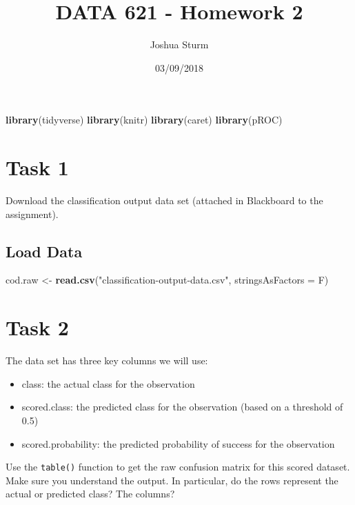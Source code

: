 \documentclass[]{article}
\title{DATA 621 - Homework 2}
\author{Joshua Sturm}
\date{03/09/2018}
\newenvironment{Shaded}{\begin{snugshade}}{\end{snugshade}}
\newcommand{\KeywordTok}[1]{\textcolor[rgb]{0.13,0.29,0.53}{\textbf{#1}}}
\newcommand{\DataTypeTok}[1]{\textcolor[rgb]{0.13,0.29,0.53}{#1}}
\newcommand{\StringTok}[1]{\textcolor[rgb]{0.31,0.60,0.02}{#1}}
\newcommand{\NormalTok}[1]{#1}
\providecommand{\tightlist}{%
  \setlength{\itemsep}{0pt}\setlength{\parskip}{0pt}}
\begin{document}
\maketitle

\begin{Shaded}
\begin{Highlighting}[]
\KeywordTok{library}\NormalTok{(tidyverse)}
\KeywordTok{library}\NormalTok{(knitr)}
\KeywordTok{library}\NormalTok{(caret)}
\KeywordTok{library}\NormalTok{(pROC)}
\end{Highlighting}
\end{Shaded}

\section{Task 1}\label{task-1}

Download the classification output data set (attached in Blackboard to
the assignment).

\subsection{Load Data}\label{load-data}

\begin{Shaded}
\begin{Highlighting}[]
\NormalTok{cod.raw <-}\StringTok{ }\KeywordTok{read.csv}\NormalTok{(}\StringTok{"classification-output-data.csv"}\NormalTok{, }\DataTypeTok{stringsAsFactors =}\NormalTok{ F)}
\end{Highlighting}
\end{Shaded}

\section{Task 2}\label{task-2}

The data set has three key columns we will use:

\begin{itemize}
\tightlist
\item
  class: the actual class for the observation
\item
  scored.class: the predicted class for the observation (based on a
  threshold of 0.5)
\item
  scored.probability: the predicted probability of success for the
  observation
\end{itemize}

Use the \texttt{table()} function to get the raw confusion matrix for
this scored dataset. Make sure you understand the output. In particular,
do the rows represent the actual or predicted class? The columns?
\end{document}

